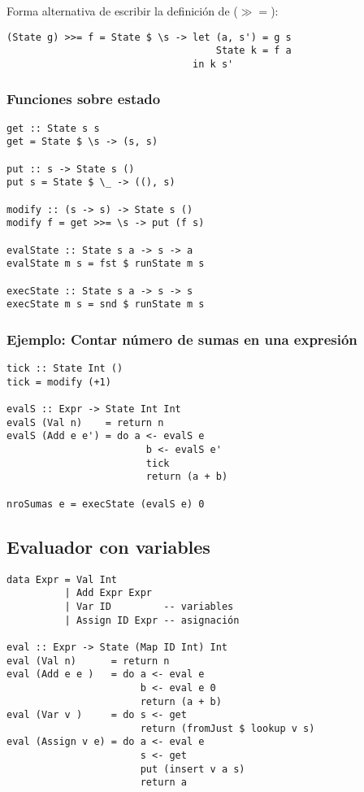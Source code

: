 \documentclass{article}
\begin{document}
Forma alternativa de escribir la definición de ($\gg=$):

\begin{lstlisting}
(State g) >>= f = State $ \s -> let (a, s') = g s
                                    State k = f a
                                in k s'
\end{lstlisting}

\subsubsection{Funciones sobre estado}

\begin{lstlisting}
get :: State s s
get = State $ \s -> (s, s)

put :: s -> State s ()
put s = State $ \_ -> ((), s)

modify :: (s -> s) -> State s ()
modify f = get >>= \s -> put (f s)

evalState :: State s a -> s -> a
evalState m s = fst $ runState m s

execState :: State s a -> s -> s
execState m s = snd $ runState m s
\end{lstlisting}

\subsubsection{Ejemplo: Contar número de sumas en una expresión}

\begin{lstlisting}
tick :: State Int ()
tick = modify (+1)

evalS :: Expr -> State Int Int
evalS (Val n)    = return n
evalS (Add e e') = do a <- evalS e
                        b <- evalS e'
                        tick
                        return (a + b)

nroSumas e = execState (evalS e) 0
\end{lstlisting}

\newpage

\subsection{Evaluador con variables}

\begin{lstlisting}
data Expr = Val Int
          | Add Expr Expr
          | Var ID         -- variables
          | Assign ID Expr -- asignación

eval :: Expr -> State (Map ID Int) Int
eval (Val n)      = return n
eval (Add e e )   = do a <- eval e
                       b <- eval e 0
                       return (a + b)
eval (Var v )     = do s <- get
                       return (fromJust $ lookup v s)
eval (Assign v e) = do a <- eval e
                       s <- get
                       put (insert v a s)
                       return a
\end{lstlisting}
\end{document}
